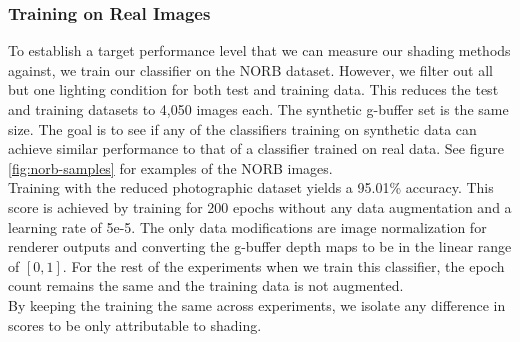 \documentclass[10pt,twocolumn,letterpaper]{article}
\begin{document}
\subsubsection{Training on Real Images}
To establish a target performance level that we can measure our shading methods against, we train our classifier on the NORB dataset. However, we filter out all but one lighting condition for both test and training data.  This reduces the test and training datasets to 4,050 images each.  The synthetic g-buffer set is the same size.  
 The goal is to see if any of the classifiers training on synthetic data can achieve similar performance to that of a classifier trained on real data.  See figure \ref{fig:norb-samples} for examples of the NORB images.\\

Training with the reduced photographic dataset yields a 95.01\% accuracy.  This score is achieved by training for 200 epochs without any data augmentation and a learning rate of 5e-5. The only data modifications are image normalization for renderer outputs and converting the g-buffer depth maps to be in the linear range of $[0,1]$.  For the rest of the experiments when we train this classifier, the epoch count remains the same and the training data is not augmented.\\  

By keeping the training the same across experiments, we isolate any difference in scores to be only attributable to shading.
\end{document}
